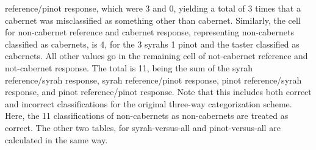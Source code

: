 reference/pinot response, which were 3 and 0, yielding a total of 3
times that a cabernet was misclassified as something other than
cabernet.  Similarly, the cell for non-cabernet reference and cabernet
response, representing non-cabernets classified as cabernets, is 4,
for the 3 syrahs 1 pinot and the taster classified as cabernets.  All
other values go in the remaining cell of not-cabernet reference and
not-cabernet response.  The total is 11, being the sum of the syrah
reference/syrah response, syrah reference/pinot response, pinot
reference/syrah response, and pinot reference/pinot response.  Note
that this includes both correct and incorrect classifications for the
original three-way categorization scheme.  Here, the 11
classifications of non-cabernets as non-cabernets are treated as
correct.  The other two tables, for syrah-versus-all and
pinot-versus-all are calculated in the same way.
  












